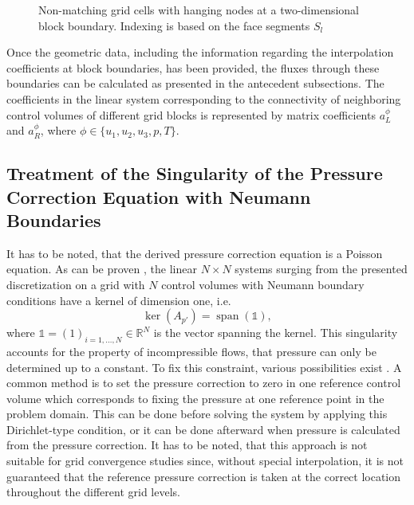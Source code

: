\begin{figure}
  \centering
  
  \caption{Non-matching grid cells with hanging nodes at a two-dimensional block boundary. Indexing is based on the face segments $S_l$}
  \label{fig:nonmatching}
\end{figure}

Once the geometric data, including the information regarding the interpolation coefficients at block boundaries, has been provided, the fluxes through these boundaries can be calculated as presented in the antecedent subsections. The coefficients in the linear system corresponding to the connectivity of neighboring control volumes of different grid blocks is represented by matrix coefficients \(a_L^{\phi}\) and \(a_R^{\phi}\), where \(\phi \in \{u_1,u_2,u_3,p,T\}\).

\subsection{Treatment of the Singularity of the Pressure Correction Equation with Neumann Boundaries}
\label{sec:singularitytreatment}

It has to be noted, that the derived pressure correction equation is a Poisson equation. As can be proven \cite{hackbusch96}, the linear \(N \times N\) systems surging from the presented discretization on a grid with \(N\) control volumes with Neumann boundary conditions have a kernel of dimension one, i.e.
\begin{displaymath}
  \operatorname{ker}(A_{p'}) = \operatorname{span}(\mathbb{1}),
\end{displaymath}
where \(\mathbb{1} = (1)_{i = 1,\dots,N} \in \mathbb{R}^N\) is the vector spanning the kernel. This singularity accounts for the property of incompressible flows, that pressure can only be determined up to a constant. To fix this constraint, various possibilities exist \cite{ferziger02}. A common method is to set the pressure correction to zero in one reference control volume which corresponds to fixing the pressure at one reference point in the problem domain. This can be done before solving the system by applying this Dirichlet-type condition, or it can be done afterward when pressure is calculated from the pressure correction. It has to be noted, that this approach is not suitable for grid convergence studies since, without special interpolation, it is not guaranteed that the reference pressure correction is taken at the correct location throughout the different grid levels.

